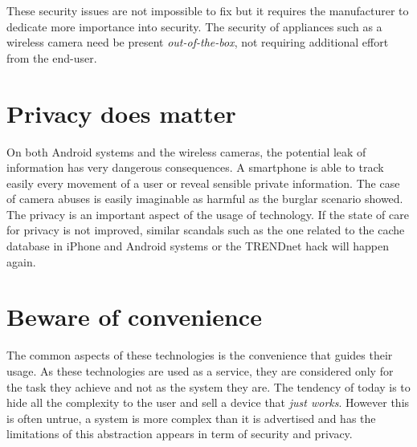These security issues are not impossible to fix but it requires the manufacturer to dedicate more importance into security.
The security of appliances such as a wireless camera need be present \emph{out-of-the-box}, not requiring additional effort from the end-user.

\section{Privacy does matter}

On both Android systems and the wireless cameras, the potential leak of information has very dangerous consequences.
A smartphone is able to track easily every movement of a user or reveal sensible private information.
The case of camera abuses is easily imaginable as harmful as the burglar scenario showed.\\

The privacy is an important aspect of the usage of technology.
If the state of care for privacy is not improved, similar scandals such as the one related to the cache database in iPhone and Android systems or the TRENDnet hack will happen again.

\section{Beware of convenience}

The common aspects of these technologies is the convenience that guides their usage.
As these technologies are used as a service, they are considered only for the task they achieve and not as the system they are.
The tendency of today is to hide all the complexity to the user and sell a device that \emph{just works}.
However this is often untrue, a system is more complex than it is advertised and has the limitations of this abstraction appears in term of security and privacy.


